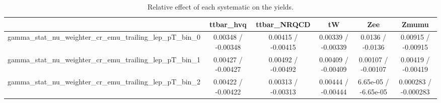 \documentclass[10pt]{article}
\begin{document}
\begin{table}[htbp]
\begin{center}
\begin{tabular}{|c|c|c|c|c|c|}
\hline 
      & ttbar_hvq      & ttbar_NRQCD      & tW      & Zee      & Zmumu \\ 
\hline 
  gamma_stat_nu_weighter_cr_emu_trailing_lep_pT_bin_0 & 0.00348 / -0.00348 & 0.00415 / -0.00415 & 0.00339 / -0.00339 & 0.0136 / -0.0136 & 0.00915 / -0.00915 \\ 
  gamma_stat_nu_weighter_cr_emu_trailing_lep_pT_bin_1 & 0.00427 / -0.00427 & 0.00492 / -0.00492 & 0.00409 / -0.00409 & 0.00107 / -0.00107 & 0.00419 / -0.00419 \\ 
  gamma_stat_nu_weighter_cr_emu_trailing_lep_pT_bin_2 & 0.00422 / -0.00422 & 0.00313 / -0.00313 & 0.00444 / -0.00444 & 6.65e-05 / -6.65e-05 & 0.000283 / -0.000283 \\ 
\hline 
\end{tabular} 
\caption{Relative effect of each systematic on the yields.} 
\end{center} 
\end{table} 
\end{document}
